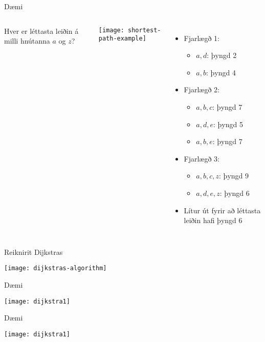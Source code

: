 \documentclass[handout]{beamer}
\begin{document}
\begin{frame}{Dæmi}
\begin{columns}
Hver er léttasta leiðin á milli hnútanna $a$ og $z$?
\begin{center}
\texttt{[image: shortest-path-example]}
\end{center}
\begin{itemize}
 \item Fjarlægð 1:
 \begin{itemize}
  \item $a, d$: þyngd 2
  \item $a, b$: þyngd 4
 \end{itemize} \pause
 \item Fjarlægð 2:
 \begin{itemize}
  \item $a, b, c$: þyngd 7
  \item $a, d, e$: þyngd 5
  \item $a, b, e$: þyngd 7
 \end{itemize} \pause
 \item Fjarlægð 3:
 \begin{itemize}
  \item $a, b, c, z$: þyngd 9
  \item $a, d, e, z$: þyngd 6
 \end{itemize}
 \item Lítur út fyrir að léttasta leiðin hafi þyngd 6
\end{itemize}
\end{columns}
\end{frame}

\begin{frame}{Reiknirit Dijkstras}
\begin{center}
\texttt{[image: dijkstras-algorithm]}
\end{center}
\end{frame}

\begin{frame}{Dæmi}
    \begin{center}
        \texttt{[image: dijkstra1]}
    \end{center}
\end{frame}

\begin{frame}{Dæmi}
    \begin{center}
        \texttt{[image: dijkstra1]}
    \end{center}
\end{frame}
\end{document}
